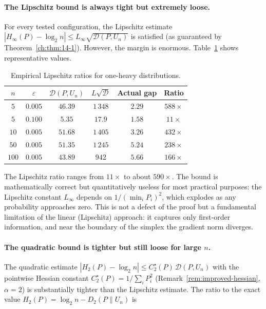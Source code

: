 \paragraph{The Lipschitz bound is always tight but extremely loose.}
For every tested configuration, the Lipschitz estimate
$|H_\infty(P)-\log_2 n|\le L_\infty\sqrt{\mathcal D(P,U_n)}$ is
satisfied (as guaranteed by Theorem~\ref{ch:thm:14-1}).  However, the
margin is enormous.  Table~\ref{tab:empirical-lipschitz} shows
representative values.

\begin{table}[ht]
\centering
\caption{Empirical Lipschitz ratios for one-heavy distributions.}
\label{tab:empirical-lipschitz}
\begin{tabular}{c|c|c|c|c|c}
$n$ & $\varepsilon$ & $\mathcal D(P,U_n)$ & $L\sqrt{\mathcal D}$ & Actual gap & Ratio \\ \hline
$5$ & $0.005$ & $46.39$ & $1\,348$ & $2.29$ & $588\times$ \\
$5$ & $0.100$ & $5.35$ & $17.9$ & $1.58$ & $11\times$ \\
$10$ & $0.005$ & $51.68$ & $1\,405$ & $3.26$ & $432\times$ \\
$50$ & $0.005$ & $51.35$ & $1\,245$ & $5.24$ & $238\times$ \\
$100$ & $0.005$ & $43.89$ & $942$ & $5.66$ & $166\times$
\end{tabular}
\end{table}

The Lipschitz ratio ranges from $11\times$ to about $590\times$.
The bound is mathematically correct but quantitatively useless for most
practical purposes: the Lipschitz constant $L_\infty$ depends on
$1/(\min_i P_i)^2$, which explodes as any probability approaches zero.
This is not a defect of the proof but a fundamental limitation of the
linear (Lipschitz) approach: it captures only first-order information,
and near the boundary of the simplex the gradient norm diverges.

\paragraph{The quadratic bound is tighter but still loose for large $n$.}
The quadratic estimate $|H_2(P)-\log_2 n|\le C_2^\star(P)\,\mathcal D(P,U_n)$
with the pointwise Hessian constant $C_2^\star(P)=1/\sum_i P_i^2$
(Remark~\ref{rem:improved-hessian}, $\alpha=2$) is
substantially tighter than the Lipschitz estimate.  The ratio to the exact value
$H_2(P)=\log_2 n-D_2(P\|U_n)$ \cite{vanerven2014renyi} is

